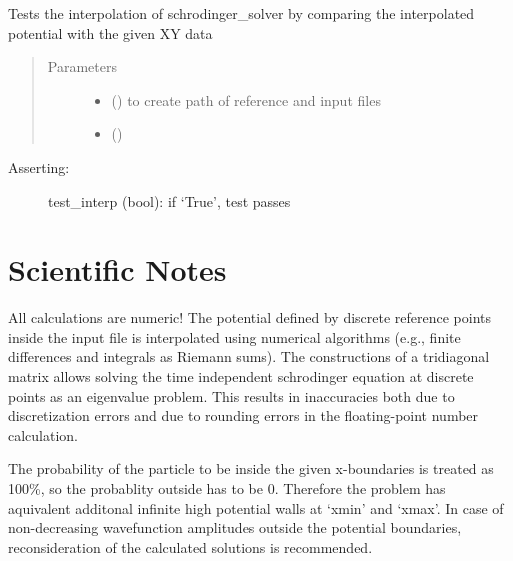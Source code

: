 \documentclass[letterpaper,10pt,english]{sphinxmanual}
\begin{document}

\begin{fulllineitems}
\label{\detokenize{index:test_schrodinger_solver.test_interpolation}}
Tests the interpolation of schrodinger\_solver by comparing the
interpolated potential with the given XY data
\begin{quote}\begin{description}
\item[{Parameters}] \leavevmode\begin{itemize}
\item {} 
 () \textendash{} to create path of reference and input files

\item {} 
 () \textendash{} 

\end{itemize}

\end{description}\end{quote}
\begin{description}
\item[{Asserting:}] \leavevmode
test\_interp (bool): if ‘True’, test passes

\end{description}

\end{fulllineitems}



\chapter{Scientific Notes}
\label{\detokenize{index:scientific-notes}}
All calculations are numeric! The potential defined by discrete reference
points inside the input file is interpolated using numerical algorithms
(e.g., finite differences and integrals as Riemann sums).
The constructions of a tridiagonal matrix allows solving the time independent
schrodinger equation at discrete points as an eigenvalue problem. This
results in inaccuracies both due to discretization errors and due to rounding
errors in the floating-point number calculation.

The probability of the particle to be inside the given x-boundaries is treated
as 100\%, so the probablity outside has to be 0. Therefore the problem has
aquivalent additonal infinite high potential walls at ‘xmin’ and ‘xmax’.
In case of non-decreasing wavefunction amplitudes outside the potential
boundaries, reconsideration of the calculated solutions is recommended.
\end{document}
